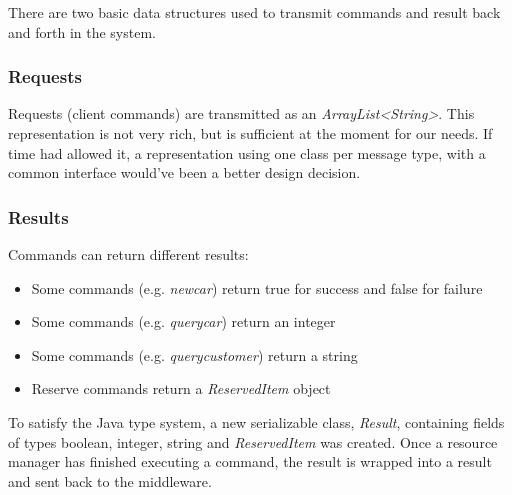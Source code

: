 \documentclass[11pt]{article}
\begin{document}
There are two basic data structures used to transmit commands and
result back and forth in the system.

\subsubsection{Requests}

Requests (client commands) are transmitted as an {\it
  ArrayList<String>}.  This representation is not very rich, but is
sufficient at the moment for our needs.  If time had allowed it, a
representation using one class per message type, with a common
interface would've been a better design decision.

\subsubsection{Results}

Commands can return different results:

\begin{itemize}
\item Some commands (e.g. {\it newcar}) return true for success and
  false for failure
\item Some commands (e.g. {\it querycar}) return an integer
\item Some commands (e.g. {\it querycustomer}) return a string
\item Reserve commands return a {\it ReservedItem} object
\end{itemize}

To satisfy the Java type system, a new serializable class, {\it
  Result}, containing fields of types boolean, integer, string and
{\it ReservedItem} was created.  Once a resource manager has finished
executing a command, the result is wrapped into a result and sent back
to the middleware.
\end{document}
